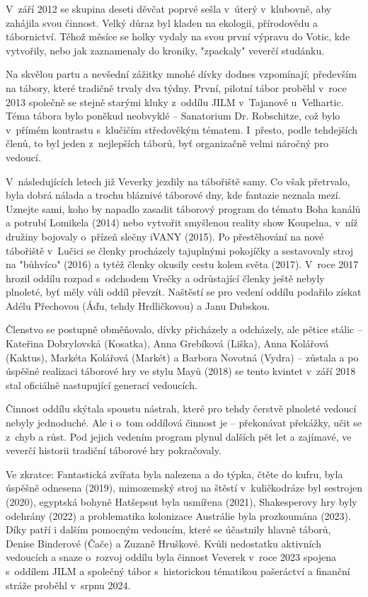 \documentclass[a5paper, 12pt, twoside]{article}
\begin{document}
V~září 2012 se skupina deseti děvčat poprvé sešla v~úterý v~klubovně,
aby zahájila svou činnost. Velký důraz byl kladen na ekologii,
přírodovědu a tábornictví. Téhož měsíce se holky vydaly na svou první
výpravu do Votic, kde vytvořily, nebo jak zaznamenaly do kroniky,
"zpackaly" veverčí studánku.

Na skvělou partu a nevšední zážitky mnohé dívky dodnes vzpomínají;
především na tábory, které tradičně trvaly dva týdny. První, pilotní
tábor proběhl v~roce 2013 společně se stejně starými kluky z~oddílu JILM
v~Tajanově u~Velhartic. Téma tábora bylo poněkud neobvyklé -- Sanatorium
Dr. Robschitze, což bylo v~přímém kontrastu s~klučičím středověkým
tématem. I~přesto, podle tehdejších členů, to byl jeden z~nejlepších
táborů, byť organizačně velmi náročný pro vedoucí.

V~následujících letech již Veverky jezdily na tábořiště samy. Co však
přetrvalo, byla dobrá nálada a trochu bláznivé táborové dny, kde
fantazie neznala mezí. Uznejte sami, koho by napadlo zasadit táborový
program do tématu Boha kanálů a potrubí Lomikela (2014) nebo vytvořit
smyšlenou reality show Koupelna, v~níž družiny bojovaly o~přízeň slečny
iVANY (2015). Po přestěhování na nové tábořiště v~Lučici se členky
procházely tajuplnými pokojíčky a sestavovaly stroj na "bůhvíco" (2016)
a tytéž členky okusily cestu kolem světa (2017). V~roce 2017 hrozil
oddílu rozpad s~odchodem Vrečky a odrůstající členky ještě nebyly
plnoleté, byť měly vůli oddíl převzít. Naštěstí se pro vedení oddílu
podařilo získat Adélu Přechovou (Áďu, tehdy Hrdličkovou) a Janu Dubskou.

Členstvo se postupně obměňovalo, dívky přicházely a odcházely, ale
pětice stálic -- Kateřina Dobrylovská (Kosatka), Anna Grebíková (Liška),
Anna Kolářová (Kaktus), Markéta Kolářová (Markét) a Barbora Novotná
(Vydra) -- zůstala a po úspěšné realizaci táborové hry ve stylu Mayů
(2018) se tento kvintet v~září 2018 stal oficiálně nastupující generací
vedoucích.

Činnost oddílu skýtala spoustu nástrah, které pro tehdy čerstvě plnoleté
vedoucí nebyly jednoduché. Ale i o~tom oddílová činnost je -- překonávat
překážky, učit se z~chyb a růst. Pod jejich vedením program plynul
dalších pět let a zajímavé, ve veverčí historii tradiční táborové hry
pokračovaly.

Ve zkratce: Fantastická zvířata byla nalezena a do týpka, čtěte do
kufru, byla úspěšně odnesena (2019), mimozemský stroj na štěstí
v~kuličkodráze byl sestrojen (2020), egyptská bohyně Hatšepsut byla
usmířena (2021), Shakesperovy hry byly odehrány (2022) a problematika
kolonizace Austrálie byla prozkoumána (2023). Díky patří i dalším
pomocným vedoucím, které se účastnily hlavně táborů, Denise Binderové
(Čače) a Zuzaně Hruškové. Kvůli nedostatku aktivních vedoucích a snaze
o~rozvoj oddílu byla činnost Veverek v~roce 2023 spojena s~oddílem JILM a
společný tábor s~historickou tématikou pašeráctví a finanční stráže
proběhl v~srpnu 2024.
\end{document}
